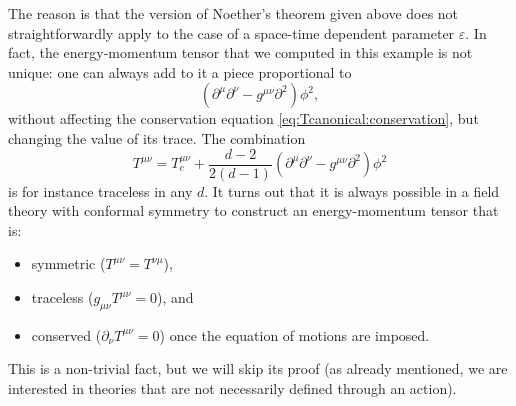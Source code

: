 \documentclass[a4paper,12pt]{article}
\numberwithin{equation}{section}
\begin{document}
The reason is that the version of Noether's theorem given above does not straightforwardly apply to the case of a space-time dependent parameter $\varepsilon$. In fact, the energy-momentum tensor that we computed in this example is not unique: one can always add to it a piece proportional to
\begin{equation}
	\left( \partial^\mu \partial^\nu - g^{\mu\nu} \partial^2 \right)
	\phi^2,
\end{equation}
without affecting the conservation equation \eqref{eq:Tcanonical:conservation}, but changing the value of its trace. The combination
\begin{equation}
	T^{\mu\nu} = T^{\mu\nu}_c + \frac{d-2}{2(d-1)}
	\left( \partial^\mu \partial^\nu - g^{\mu\nu} \partial^2 \right)
	\phi^2
\end{equation}
is for instance traceless in any $d$.
It turns out that it is always possible in a field theory with conformal symmetry to construct an energy-momentum tensor that is:
\begin{itemize}
\item symmetric ($T^{\mu\nu} = T^{\nu\mu}$),
\item traceless ($g_{\mu\nu} T^{\mu\nu} = 0$), and
\item conserved ($\partial_\nu T^{\mu\nu} = 0$) once the equation of motions are imposed.
\end{itemize}
This is a non-trivial fact, but we will skip its proof (as already mentioned, we are interested in theories that are not necessarily defined through an action).
\end{document}
